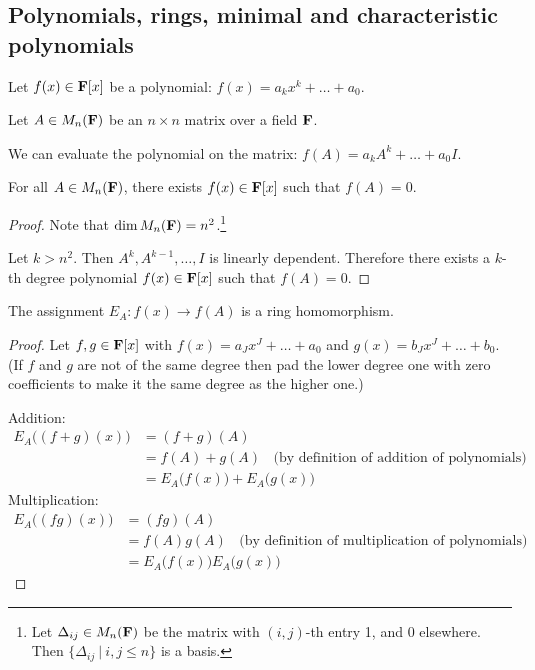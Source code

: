 \begin{lemma}
{\newpage
\section{Polynomials, rings, minimal and characteristic polynomials}

Let $f(x) \in \mathbf{F}[x]$ be a polynomial: $f(x) = a_kx^k + \ldots + a_0$.

Let $A \in M_n(\mathbf{F})$ be an $n \times n$ matrix over a field $\mathbf{F}$.

We can evaluate the polynomial on the matrix: $f(A) = a_kA^k + \ldots + a_0I$.

\begin{theorem*}
  For all $A \in M_n(\mathbf{F})$, there exists $f(x) \in \mathbf{F}[x]$ such that $f(A) = 0$.
\end{theorem*}

\begin{proof}
  Note that $\dim M_n(\mathbf{F}) = n^2$.\footnote{Let $\Delta_{ij} \in M_n(\mathbf{F})$ be the matrix with $(i,j)$-th entry 1, and 0
    elsewhere. Then $\{\Delta_{ij} ~|~ i,j \leq n\}$ is a basis.}

  Let $k > n^2$. Then $A^k, A^{k-1}, \ldots, I$ is linearly dependent. Therefore there exists a
  $k$-th degree polynomial $f(x) \in \mathbf{F}[x]$ such that $f(A) = 0$.
\end{proof}

\begin{theorem*}
  The assignment $E_A: f(x) \to f(A)$ is a ring homomorphism.
\end{theorem*}


\begin{proof}
  Let $f, g \in \mathbf{F}[x]$ with $f(x) = a_Jx^J + \ldots + a_0$ and $g(x) = b_Jx^J + \ldots + b_0$. (If
  $f$ and $g$ are not of the same degree then pad the lower degree one with zero coefficients to
  make it the same degree as the higher one.)

  Addition:
  \begin{align*}
    E_A\Big((f + g)(x)\Big) &= (f + g)(A)\\
                            &= f(A) + g(A)~~~~\text{(by definition of addition of polynomials)}\\
                            &= E_A\Big(f(x)\Big) + E_A\Big(g(x)\Big)
  \end{align*}
  Multiplication:
  \begin{align*}
    E_A\Big((fg)(x)\Big)    &= (fg)(A)\\
                            &= f(A)g(A)~~~~\text{(by definition of multiplication of polynomials)}\\
                            &= E_A\Big(f(x)\Big)E_A\Big(g(x)\Big)
  \end{align*}
\end{proof}

}
\end{lemma}
